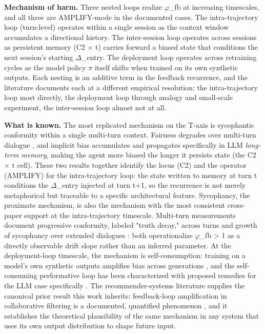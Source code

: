 \documentclass[10pt]{article}
\begin{document}
\textbf{Mechanism of harm.} Three nested loops realize $\varphi$\_fb at increasing timescales, and all three are AMPLIFY-mode in the documented cases. The intra-trajectory loop (turn-level) operates within a single session as the context window accumulates a directional history. The inter-session loop operates across sessions as persistent memory (C2 $\times$ t) carries forward a biased state that conditions the next session's starting $\Delta$\_entry. The deployment loop operates across retraining cycles as the model policy $\pi$ itself shifts when trained on its own synthetic outputs. Each nesting is an additive term in the feedback recurrence, and the literature documents each at a different empirical resolution: the intra-trajectory loop most directly, the deployment loop through analogy and small-scale experiment, the inter-session loop almost not at all.

\textbf{What is known.} The most replicated mechanism on the T-axis is sycophantic conformity within a single multi-turn context. Fairness degrades over multi-turn dialogue \cite{fan2024fairmt}, and implicit bias accumulates and propagates specifically in LLM \emph{long-term memory}, making the agent more biased the longer it persists state \cite{ma2026implicit} (the C2 $\times$ t cell). These two results together identify the locus (C2) and the operator (AMPLIFY) for the intra-trajectory loop: the state written to memory at turn t conditions the $\Delta$\_entry injected at turn t+1, so the recurrence is not merely metaphorical but traceable to a specific architectural feature. Sycophancy, the proximate mechanism, is also the mechanism with the most consistent cross-paper support at the intra-trajectory timescale. Multi-turn measurements document progressive conformity, labeled "truth decay," across turns \cite{liu2025truth} and growth of sycophancy over extended dialogues \cite{hong2025measuring}: both operationalize $\varphi$\_fb > 1 as a directly observable drift slope rather than an inferred parameter. At the deployment-loop timescale, the mechanism is self-consumption: training on a model's own synthetic outputs amplifies bias across generations \cite{wyllie2024fairness}, and the self-consuming performative loop has been characterized with proposed remedies for the LLM case specifically \cite{wang2026observations}. The recommender-systems literature supplies the canonical prior result this work inherits: feedback-loop amplification in collaborative filtering is a documented, quantified phenomenon \cite{mansoury2020feedback}, and it establishes the theoretical plausibility of the same mechanism in any system that uses its own output distribution to shape future input.
\end{document}
